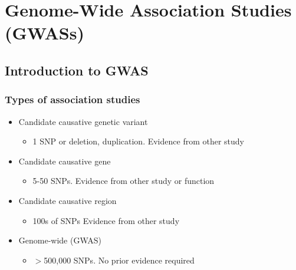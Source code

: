 \documentclass[xcolor=pdftex,dvipsnames,table,10pt]{beamer}
\begin{document}
\section{Genome-Wide Association Studies (GWASs)}

\subsection{Introduction to GWAS}
\begin{frame}
  \frametitle{Types of association studies}
  \vspace{-1cm}
  \begin{itemize}
  \item<1-> Candidate causative genetic variant
 \begin{itemize}
 \item 
1 SNP or deletion, duplication.
Evidence from other study
\end{itemize}
\item<1-> Candidate causative gene 
 \begin{itemize}
 \item 5-50 SNPs.
Evidence from other study or function\end{itemize}

\item<1-> 
Candidate causative region \begin{itemize}
\item<1->
100s of SNPs
Evidence from other study\end{itemize}

\item<1-> 
Genome-wide (GWAS) \begin{itemize}
\item<1-> 
$>$500,000 SNPs.
No prior evidence required
\end{itemize}
  \end{itemize}
\end{frame}
\end{document}

